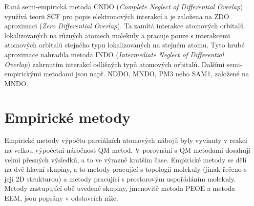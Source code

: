 Raná semi-empirická metoda CNDO (\textit{Complete Neglect of Differential Overlap}) využívá teorii SCF pro popis elektronových interakcí a je založena na ZDO aproximaci (\textit{Zero Differential Overlap}). Ta zamítá interakce atomových orbitalů lokalizovaných na různých atomech molekuly a pracuje pouze s interakcemi atomových orbitalů stejného typu lokalizovaných na stejném atomu. 
Tyto hrubé aproximace nahradila metoda INDO  (\textit{Intermediate Neglect of Differential Overlap}) zahrnutím interakcí odlišných typů atomových orbitalů. Dalšími semi-empirickými metodami jsou např. NDDO, MNDO, PM3 nebo SAM1, založené na MNDO. 

\section{Empirické metody}
Empirické metody výpočtu parciálních atomových nábojů byly vyvinuty v reakci na velkou výpočetní náročnost QM metod. V porovnání s QM metodami dosahují velmi přesných výsledků, a to ve výrazně kratším čase. Empirické metody se dělí na dvě hlavní skupiny, a to metody pracující s topologií molekuly (jinak řečeno s její 2D strukturou) a metody pracující s prostorovým uspořádáním molekuly. Metody zastupující obě uvedené skupiny, jmenovitě metoda PEOE a metoda EEM, jsou popsány v odstavcích níže.

